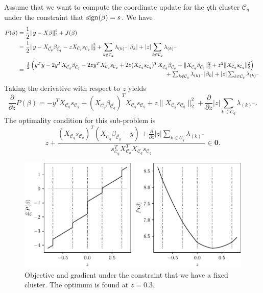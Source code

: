 Assume that we want to compute the coordinate update for the \(q\)th cluster
\(\mathcal{C}_q\) under the constraint that \(\operatorname{sign}(\beta) = s\).
We have
\[
  \begin{aligned}
    P(\beta) & = \frac{1}{2} \lVert y - X\beta\rVert_2^2 + J(\beta)                                                                                                                                                                                                                        \\
             & = \frac{1}{2} \lVert y - X_{\bar{\mathcal{C}_q}} \beta_{\bar{\mathcal{C}_q}} - z X_{\mathcal{C}_q} s_{\mathcal{C}_q} \rVert_2^2 + \sum_{k \notin {\mathcal{C}_q}} \lambda_{(k)^-}|\beta_k| + |z|\sum_{k \in {\mathcal{C}_q}} \lambda_{(k)^-}                                                                                                                            \\
             & = \splitfrac{\frac{1}{2} \left(y^Ty - 2y^T X_{\bar{\mathcal{C}_q}} \beta_{\bar{\mathcal{C}_q}} - 2 z y^T X_{\mathcal{C}_q} s_{\mathcal{C}_q} + 2 z (X_{\mathcal{C}_q} s_{\mathcal{C}_q})^T X_{\bar{\mathcal{C}_q}} \beta_{\bar{\mathcal{C}_q}} + \lVert X_{\bar{\mathcal{C}_q}} \beta_{\bar{\mathcal{C}_q}} \rVert_2^2 + z^2 \lVert X_{\mathcal{C}_q} s_{\mathcal{C}_q}\rVert_2^2 \right)}{+ \sum_{k \notin {\mathcal{C}_q}} \lambda_{(k)^-}|\beta_k| + |z|\sum_{k \in {\mathcal{C}_q}} \lambda_{(k)^-}} \\
  \end{aligned}
\]
Taking the derivative with respect to \(z\) yields
\[
  \frac{\partial}{\partial z}P(\beta) = -y^T X_{\mathcal{C}_q} s_{\mathcal{C}_q} + (X_{\bar{\mathcal{C}_q}} \beta_{\bar{\mathcal{C}_q}})^T{X_{\mathcal{C}_q} s_{\mathcal{C}_q}} + z \lVert X_{\mathcal{C}_q} s_{\mathcal{C}_q} \rVert_2^2 + \frac{\partial}{\partial z}|z|\sum_{k \in {\mathcal{C}_q}} \lambda_{(k)^-}.
\]
The optimality condition for this sub-problem is
\[
  z + \frac{(X_{\mathcal{C}_q} s_{\mathcal{C}_q})^T\left( X_{\bar{\mathcal{C}_q}}\beta_{\bar{\mathcal{C}_q}} - y \right) + \frac{\partial}{\partial z}|z|\sum_{k \in {\mathcal{C}_q}} \lambda_{(k)^-}}{s_{\mathcal{C}_q}^T X_{{\mathcal{C}_q}}^T X_{\mathcal{C}_q} s_{\mathcal{C}_q}} \in \boldsymbol{0}.
\]

\begin{figure}[htbp]
  \centering
  \includegraphics[]{figures/clusterupdate-grad-obj}
  \caption{%
    Objective and gradient under the constraint that we have a fixed
    cluster. The optimum is found at \(z = 0.3\).
  }
  \label{fig:cluster-grad-obj}
\end{figure}



